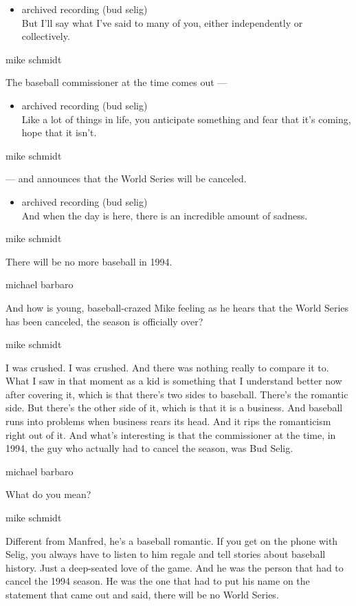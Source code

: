 \begin{itemize}
\tightlist
\item
  archived recording (bud selig)\\
  But I'll say what I've said to many of you, either independently or
  collectively.
\end{itemize}

mike schmidt

The baseball commissioner at the time comes out ---

\begin{itemize}
\tightlist
\item
  archived recording (bud selig)\\
  Like a lot of things in life, you anticipate something and fear that
  it's coming, hope that it isn't.
\end{itemize}

mike schmidt

--- and announces that the World Series will be canceled.

\begin{itemize}
\tightlist
\item
  archived recording (bud selig)\\
  And when the day is here, there is an incredible amount of sadness.
\end{itemize}

mike schmidt

There will be no more baseball in 1994.

michael barbaro

And how is young, baseball-crazed Mike feeling as he hears that the
World Series has been canceled, the season is officially over?

mike schmidt

I was crushed. I was crushed. And there was nothing really to compare it
to. What I saw in that moment as a kid is something that I understand
better now after covering it, which is that there's two sides to
baseball. There's the romantic side. But there's the other side of it,
which is that it is a business. And baseball runs into problems when
business rears its head. And it rips the romanticism right out of it.
And what's interesting is that the commissioner at the time, in 1994,
the guy who actually had to cancel the season, was Bud Selig.

michael barbaro

What do you mean?

mike schmidt

Different from Manfred, he's a baseball romantic. If you get on the
phone with Selig, you always have to listen to him regale and tell
stories about baseball history. Just a deep-seated love of the game. And
he was the person that had to cancel the 1994 season. He was the one
that had to put his name on the statement that came out and said, there
will be no World Series.

